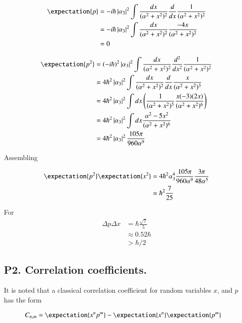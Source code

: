 \begin{align*}
\expectation{p} 
&= -i \hbar \Abs{\alpha_3}^2 \int \frac{dx}{(\alpha^2 + x^2)^2} \frac{d}{dx} \frac{1}{(\alpha^2 + x^2)^2}  \\
&= -i \hbar \Abs{\alpha_3}^2 \int \frac{dx}{(\alpha^2 + x^2)^2} \frac{-4x}{(\alpha^2 + x^2)^2} \\
&= 0
\end{align*}

\begin{align*}
\expectation{p^2} 
&= (-i \hbar)^2 \Abs{\alpha_3}^2 \int \frac{dx}{(\alpha^2 + x^2)^2} \frac{d^2}{dx^2} \frac{1}{(\alpha^2 + x^2)^2}  \\
&= 4 \hbar^2 \Abs{\alpha_3}^2 \int \frac{dx}{(\alpha^2 + x^2)^2} \frac{d}{dx} \frac{x}{(\alpha^2 + x^2)^3} \\
&= 4 \hbar^2 \Abs{\alpha_3}^2 \int dx
\left( \frac{1}{(\alpha^2 + x^2)^5} \frac{x(-3)(2x)}{(\alpha^2 + x^2)^6} \right)
\\
&= 4 \hbar^2 \Abs{\alpha_3}^2 \int dx \frac{\alpha^2 - 5x^2}{(\alpha^2 + x^2)^6} 
\\
&= 4 \hbar^2 \Abs{\alpha_3}^2 \frac{105 \pi}{960 \alpha^9}
\\
\end{align*}

Assembling

\begin{align*}
\expectation{p^2} \expectation{x^2} 
&= 4 \hbar^2 \alpha_3^4 \frac{105 \pi}{960 \alpha^9} \frac{3 \pi}{48 \alpha^5} \\
&= \hbar^2 \frac{7}{25}
\end{align*}

For
\begin{align*}
\Delta{p} \Delta{x} 
&= \hbar \frac{\sqrt{7}}{5} \\
&\approx 0.52 \hbar  \\
&> \hbar/2
\end{align*}

\subsection{P2. Correlation coefficients. }

It is noted that a classical correlation coefficient for random variables $x$, and $p$ has the form

\begin{align*}
C_{n,m}
&= \expectation{x^n p^m} - \expectation{x^n}\expectation{p^m}
\end{align*}

